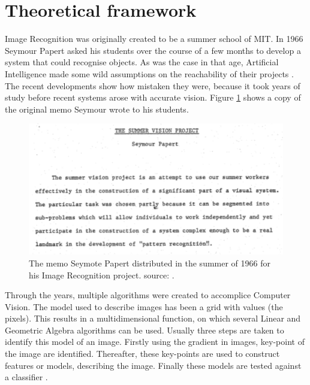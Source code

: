 \section{Theoretical framework}
\label{sec:Theory}
Image Recognition was originally created to be a summer school of MIT.
In 1966 Seymour Papert asked his students over the course of a few months to develop a system that could recognise objects.
As was the case in that age, Artificial Intelligence made some wild assumptions on the reachability of their projects \citep{szeliski2010computer}.
The recent developments show how mistaken they were, because it took years of study before recent systems arose with accurate vision.
Figure \ref{fig:mit-note} shows a copy of the original memo Seymour wrote to his students.

\begin{figure}[h!bt]
\centering
\ifx\showfig\undefined
\includegraphics[keepaspectratio=true,width=.7\textwidth]{images/MITnote.png}\fi
\captionsetup{width=.7\textwidth}
\caption{The memo Seymote Papert distributed in the summer of 1966 for his Image Recognition project. source: \citet{mensink12phd}.}
\label{fig:mit-note}
\end{figure}

Through the years, multiple algorithms were created to accomplice Computer Vision.
The model used to describe images has been a grid with values (the pixels).
This results in a multidimensional function, on which several Linear and Geometric Algebra algorithms can be used.
Usually three steps are taken to identify this model of an image.
Firstly using the gradient in images, key-point of the image are identified.
Thereafter, these key-points are used to construct features or models, describing the image.
Finally these models are tested against a classifier \citep{szeliski2010computer}.


